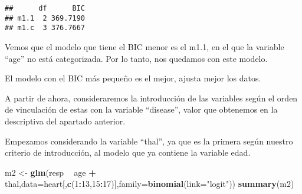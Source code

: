 \documentclass[]{article}
\newenvironment{Shaded}{\begin{snugshade}}{\end{snugshade}}
\newcommand{\KeywordTok}[1]{\textcolor[rgb]{0.13,0.29,0.53}{\textbf{#1}}}
\newcommand{\DataTypeTok}[1]{\textcolor[rgb]{0.13,0.29,0.53}{#1}}
\newcommand{\DecValTok}[1]{\textcolor[rgb]{0.00,0.00,0.81}{#1}}
\newcommand{\StringTok}[1]{\textcolor[rgb]{0.31,0.60,0.02}{#1}}
\newcommand{\OperatorTok}[1]{\textcolor[rgb]{0.81,0.36,0.00}{\textbf{#1}}}
\newcommand{\NormalTok}[1]{#1}
\begin{document}
\begin{Shaded}
\end{Shaded}

\begin{verbatim}
##      df      BIC
## m1.1  2 369.7190
## m1.c  3 376.7667
\end{verbatim}

Vemos que el modelo que tiene el BIC menor es el m1.1, en el que la
variable ``age'' no está categorizada. Por lo tanto, nos quedamos con
este modelo.

El modelo con el BIC más pequeño es el mejor, ajusta mejor los datos.

A partir de ahora, consideraremos la introducción de las variables según
el orden de vinculación de estas con la variable ``disease'', valor que
obtenemos en la descriptiva del apartado anterior.

Empezamos considerando la variable ``thal'', ya que es la primera según
nuestro criterio de introducción, al modelo que ya contiene la variable
edad.

\begin{Shaded}
\begin{Highlighting}[]
\NormalTok{m2 <-}\StringTok{  }\KeywordTok{glm}\NormalTok{(resp }\OperatorTok{~}\StringTok{ }\NormalTok{age }\OperatorTok{+}\StringTok{ }\NormalTok{thal,}\DataTypeTok{data=}\NormalTok{heart[,}\KeywordTok{c}\NormalTok{(}\DecValTok{1}\OperatorTok{:}\DecValTok{13}\NormalTok{,}\DecValTok{15}\OperatorTok{:}\DecValTok{17}\NormalTok{)],}\DataTypeTok{family=}\KeywordTok{binomial}\NormalTok{(}\DataTypeTok{link=}\StringTok{"logit"}\NormalTok{)) }
\KeywordTok{summary}\NormalTok{(m2)}
\end{Highlighting}
\end{Shaded}
\end{document}
